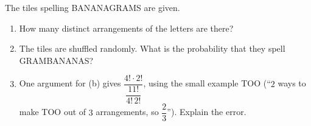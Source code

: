 The tiles spelling BANANAGRAMS are given.
\begin{enumerate}
\item[(a)] How many distinct arrangements of the letters are there?
\item[(b)] The tiles are shuffled randomly. What is the probability that they spell GRAMBANANAS?
\item[(c)] One argument for (b) gives $\dfrac{4!\cdot2!}{\dfrac{11!}{4!\,2!}}$, using the small example TOO (``$2$ ways to make TOO out of $3$ arrangements, so $\dfrac23$''). Explain the error.
\end{enumerate}
